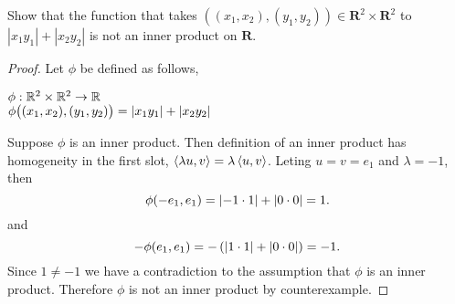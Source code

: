 Show that the function that takes $((x_1,x_2) , (y_1,y_2)) \in \mathbf{R}^2 \times \mathbf{R}^2$ to $|x_1y_1| + |x_2y_2|$ is not an inner product on $\mathbf{R}$.
\begin{mybox}
    \begin{proof}
        Let $\phi$ be defined as follows,
        \begin{center}
            $\phi : \mathbb{R}^2 \times \mathbb{R}^2 \to \mathbb{R}$ \\
            $\phi\big( (x_1, x_2), (y_1, y_2) \big) = \left| {x_1y_1} \right| + \left| {x_2y_2} \right|$
        \end{center}
        Suppose $\phi$ is an inner product. Then definition of an inner product has homogeneity in the first slot, $\left\langle{\lambda u, v}\right\rangle = \lambda \left\langle{u,v}\right\rangle$. Leting $u = v = e_1$ and $\lambda = -1$, then
        $$\phi(-e_1, e_1) = \left| {-1 \cdot 1} \right| + \left| {0 \cdot 0} \right| = 1.$$
        and 
        $$-\phi(e_1, e_1) = -\left( {\left| {1 \cdot 1} \right| + \left| {0\cdot0} \right|} \right) = -1.$$
        Since $1 \neq -1$ we have a contradiction to the assumption that $\phi$ is an inner product. Therefore $\phi$ is not an inner product by counterexample.
\end{proof}
\end{mybox}